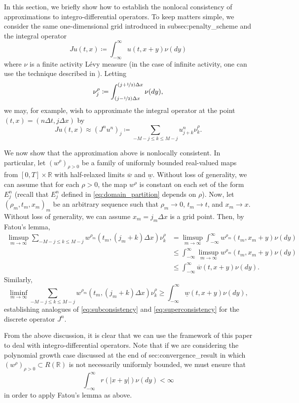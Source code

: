 \documentclass[12pt]{article}
\begin{document}
In this section, we briefly show how to establish the nonlocal consistency
of approximations to integro-differential operators. To keep matters
simple, we consider the same one-dimensional grid introduced in {\prettyref}{subsec:penalty_scheme}
and the integral operator
\[
Ju(t,x)\coloneqq\int_{-\infty}^{\infty}u(t,x+y)\nu(dy)
\]
where $\nu$ is a finite activity L\'{e}vy measure (in the case of infinite
activity, one can use the technique described in \cite[Section 5.2]{MR2182141}).
Letting
\[
\nu_{j}^{\rho}\coloneqq\int_{(j-\nicefrac{1}{2})\Delta x}^{(j+\nicefrac{1}{2})\Delta x}\nu(dy),
\]
we may, for example, wish to approximate the integral operator at
the point $(t,x)=(n\Delta t,j\Delta x)$ by
\[
Ju(t,x)\approx(J^{n}u^{n})_{j}\coloneqq\sum_{-M-j{\leqslant} k{\leqslant} M-j}u_{j+k}^{n}\nu_{k}^{\rho}.
\]

We now show that the approximation above is nonlocally consistent.
In particular, let $(w^{\rho})_{\rho>0}$ be a family of uniformly
bounded real-valued maps from $[0,T]\times\mathbb{R}$ with half-relaxed
limits $\overline{w}$ and $\underline{w}$. Without loss of generality,
we can assume that for each $\rho>0$, the map $w^{\rho}$ is constant
on each set of the form $E_{j}^{n}$ (recall that $E_{j}^{n}$ defined
in \eqref{eq:domain_partition} depends on $\rho$). Now, let $(\rho_{m},t_{m},x_{m})_{m}$
be an arbitrary sequence such that $\rho_{m}\rightarrow0$, $t_{m}\rightarrow t$,
and $x_{m}\rightarrow x$. Without loss of generality, we can assume
$x_{m}=j_{m}\Delta x$ is a grid point. Then, by Fatou's lemma,
\begin{align*}
\limsup_{m\rightarrow\infty}\sum_{-M-j{\leqslant} k{\leqslant} M-j}w^{\rho_{m}}(t_{m},(j_{m}+k)\Delta x)\nu_{k}^{\rho} & =\limsup_{m\rightarrow\infty}\int_{-\infty}^{\infty}w^{\rho_{m}}(t_{m},x_{m}+y)\nu(dy)\\
 & {\leqslant}\int_{-\infty}^{\infty}\limsup_{m\rightarrow\infty}w^{\rho_{m}}(t_{m},x_{m}+y)\nu(dy)\\
 & {\leqslant}\int_{-\infty}^{\infty}\overline{w}(t,x+y)\nu(dy).
\end{align*}
Similarly,
\[
\liminf_{m\rightarrow\infty}\sum_{-M-j{\leqslant} k{\leqslant} M-j}w^{\rho_{m}}(t_{m},(j_{m}+k)\Delta x)\nu_{k}^{\rho}{\geqslant}\int_{-\infty}^{\infty}\underline{w}(t,x+y)\nu(dy),
\]
establishing analogues of \eqref{eq:subconsistency} and \eqref{eq:superconsistency}
for the discrete operator $J^{n}$.

From the above discussion, it is clear that we can use the framework
of this paper to deal with integro-differential operators. Note that
if we are considering the polynomial growth case discussed at the
end of {\prettyref}{sec:convergence_result} in which $(w^{\rho})_{\rho>0}\subset R(\mathbb{R})$
is not necessarily uniformly bounded, we must ensure that
\[
\int_{-\infty}^{\infty}r(|x+y|)\nu(dy)<\infty
\]
in order to apply Fatou's lemma as above.
\end{document}
